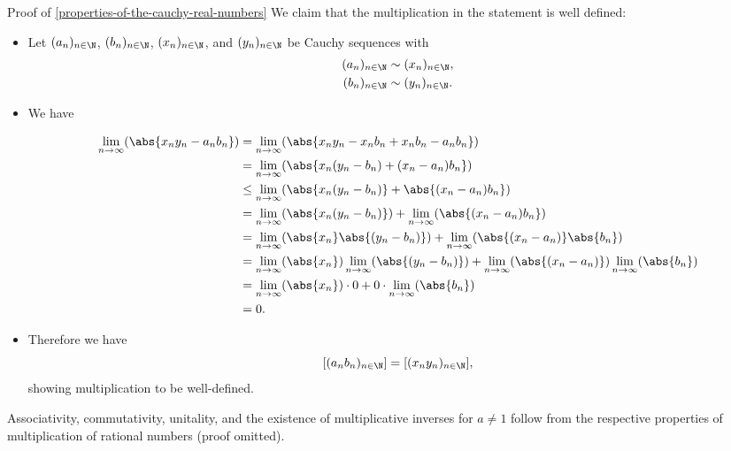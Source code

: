 \begin{Proof}{Proof of \cref{properties-of-the-cauchy-real-numbers}}
    We claim that the multiplication in the statement is well defined:
    \begin{itemize}
        \item Let $(a_{n})_{n\in\N}$, $(b_{n})_{n\in\N}$, $(x_{n})_{n\in\N}$, and $(y_{n})_{n\in\N}$ be Cauchy sequences with
            \begin{align*}
                (a_{n})_{n\in\N} &\sim (x_{n})_{n\in\N},\\
                (b_{n})_{n\in\N} &\sim (y_{n})_{n\in\N}.
            \end{align*}
        \item We have
            \begin{envsmallsize}
                \begin{align*}
                    \lim_{n\to\infty}(\abs{x_{n}y_{n}-a_{n}b_{n}}) &=    \lim_{n\to\infty}(\abs{x_{n}y_{n}-x_{n}b_{n}+x_{n}b_{n}-a_{n}b_{n}})\\
                                                                   &=    \lim_{n\to\infty}(\abs{x_{n}(y_{n}-b_{n})+(x_{n}-a_{n})b_{n}})\\
                                                                   &\leq \lim_{n\to\infty}(\abs{x_{n}(y_{n}-b_{n})}+\abs{(x_{n}-a_{n})b_{n}})\\
                                                                   &=    \lim_{n\to\infty}(\abs{x_{n}(y_{n}-b_{n})})+\lim_{n\to\infty}(\abs{(x_{n}-a_{n})b_{n}})\\
                                                                   &=    \lim_{n\to\infty}(\abs{x_{n}}\abs{(y_{n}-b_{n})})+\lim_{n\to\infty}(\abs{(x_{n}-a_{n})}\abs{b_{n}})\\
                                                                   &=    \lim_{n\to\infty}(\abs{x_{n}})\lim_{n\to\infty}(\abs{(y_{n}-b_{n})})+\lim_{n\to\infty}(\abs{(x_{n}-a_{n})})\lim_{n\to\infty}(\abs{b_{n}})\\
                                                                   &=    \lim_{n\to\infty}(\abs{x_{n}})\cdot0+0\cdot\lim_{n\to\infty}(\abs{b_{n}})\\
                                                                   &=    0.
                \end{align*}
            \end{envsmallsize}
        \item Therefore we have
            \[
                [(a_{n}b_{n})_{n\in\N}]%
                =%
                [(x_{n}y_{n})_{n\in\N}],%
            \]%
            showing multiplication to be well-defined.
    \end{itemize}
    Associativity, commutativity, unitality, and the existence of multiplicative inverses for $a\neq1$ follow from the respective properties of multiplication of rational numbers (proof omitted).


\end{Proof}
